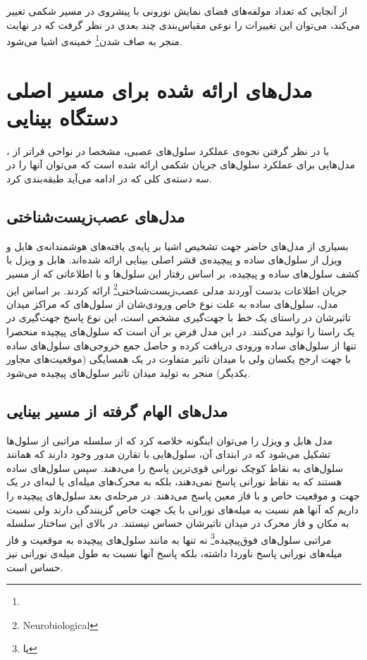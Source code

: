از آنجایی که تعداد مولفه‌های فضای نمایش نورونی با پیشروی در مسیر شکمی تغییر  می‌کند، می‌توان این تغییرات را نوعی مقیاس‌بندی چند بعدی در نظر گرفت که در نهایت منجر به صاف شدن\footnote{} خمینه‌ی اشیا می‌شود. 

\section{مدل‌های ارائه شده برای مسیر اصلی دستگاه بینایی}
با در نظر گرفتن نحوه‌ی عملکرد سلول‌های عصبی، مشخصا در نواحی فراتر از ، مدل‌هایی برای عملکرد سلول‌های جریان شکمی ارائه شده است که می‌توان آنها را در سه دسته‌ی کلی که در ادامه می‌آید طبقه‌بندی کرد.

\subsection{مدل‌های عصب‌زیست‌شناختی}
بسیاری از مدل‌های حاضر جهت تشخیص اشیا بر پایه‌ی یافته‌های هوشمندانه‌ی هابل و ویزل از سلول‌های ساده و پیچیده‌ی قشر اصلی بینایی ارائه شده‌اند. 
هابل و ویزل با کشف سلول‌های ساده و پیچیده، بر اساس رفتار این سلول‌ها و با اطلاعاتی که از مسیر جریان اطلاعات بدست آوردند مدلی عصب‌زیست‌شناختی\footnote{Neurobiological} ارائه کردند. بر اساس این مدل، سلول‌های ساده به علت نوع خاص ورودی‌شان از سلول‌های  که مراکز میدان تاثیرشان در راستای یک خط با جهت‌گیری مشخص است، این نوع پاسخ جهت‌گیری در یک راستا را تولید می‌کنند. 
در این مدل فرض بر آن است که سلول‌های پیچیده منحصرا تنها از سلول‌های ساده ورودی دریافت کرده و حاصل جمع خروجی‌های سلول‌های ساده با جهت ارجح یکسان ولی با میدان تاثیر متفاوت در یک همسایگی (موقعیت‌های مجاور یکدیگر) منجر به تولید میدان تاثیر سلول‌های پیچیده می‌شود. 

\subsection{مدل‌های الهام گرفته از مسیر بینایی}
مدل هابل و ویزل را می‌توان اینگونه خلاصه کرد که از سلسله مراتبی از سلول‌ها تشکیل می‌شود که در ابتدای آن، سلول‌هایی با تقارن مدور وجود دارند که همانند سلول‌های  به نقاط کوچک نورانی قوی‌ترین پاسخ را می‌دهند. سپس سلول‌های ساده هستند که به نقاط نورانی پاسخ نمی‌دهند، بلکه به محرک‌های میله‌ای یا لبه‌ای در یک جهت و موقعیت خاص و با فاز معین پاسخ می‌دهند. در مرحله‌ی بعد سلول‌های پیچیده را داریم که آنها هم نسبت به میله‌های نورانی با یک جهت خاص گزینندگی دارند ولی نسبت به مکان و فاز محرک در میدان تاثیر‌شان حساس نیستند. در بالای این ساختار سلسله مراتبی سلول‌های فوق‌پیچیده\footnote{ یا } نه تنها به مانند سلول‌های پیچیده به موقعیت و فاز میله‌های نورانی پاسخ ناوردا داشته، بلکه پاسخ آنها نسبت به طول میله‌ی نورانی نیز حساس است.

